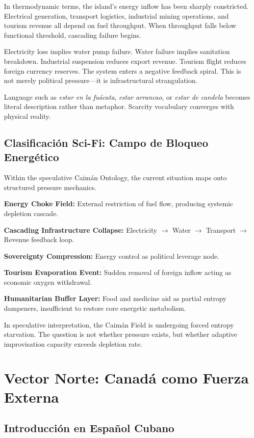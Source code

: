 \documentclass[12pt]{article}
\begin{document}
In thermodynamic terms, the island's energy inflow has been sharply constricted. Electrical generation, transport logistics, industrial mining operations, and tourism revenue all depend on fuel throughput. When throughput falls below functional threshold, cascading failure begins.

Electricity loss implies water pump failure. Water failure implies sanitation breakdown. Industrial suspension reduces export revenue. Tourism flight reduces foreign currency reserves. The system enters a negative feedback spiral. This is not merely political pressure---it is infrastructural strangulation.

Language such as \textit{estar en la fuácata}, \textit{estar arrancao}, or \textit{estar de candela} becomes literal description rather than metaphor. Scarcity vocabulary converges with physical reality.

\subsection*{Clasificación Sci-Fi: Campo de Bloqueo Energético}

Within the speculative Caimán Ontology, the current situation maps onto structured pressure mechanics.

\textbf{Energy Choke Field:} External restriction of fuel flow, producing systemic depletion cascade.

\textbf{Cascading Infrastructure Collapse:} Electricity $\to$ Water $\to$ Transport $\to$ Revenue feedback loop.

\textbf{Sovereignty Compression:} Energy control as political leverage node.

\textbf{Tourism Evaporation Event:} Sudden removal of foreign inflow acting as economic oxygen withdrawal.

\textbf{Humanitarian Buffer Layer:} Food and medicine aid as partial entropy dampeners, insufficient to restore core energetic metabolism.

In speculative interpretation, the Caimán Field is undergoing forced entropy starvation. The question is not whether pressure exists, but whether adaptive improvisation capacity exceeds depletion rate.

\section{Vector Norte: Canadá como Fuerza Externa}

\subsection*{Introducción en Español Cubano}
\end{document}
